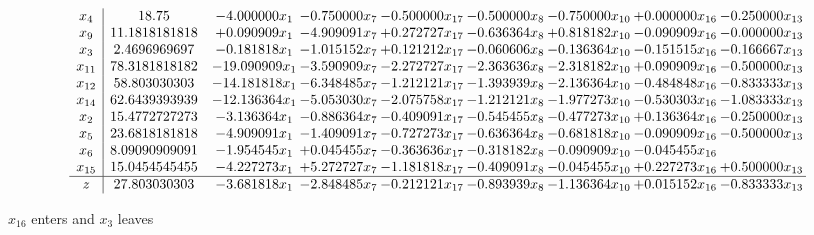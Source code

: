 \documentclass[10pt]{article}
\begin{document}
 \[\begin{array}{c| c c@{\hskip 2pt} c@{\hskip 2pt} c@{\hskip 2pt} c@{\hskip 2pt} c@{\hskip 2pt} c@{\hskip 2pt} c@{\hskip 2pt} }
 x_{4}   &  18.75 & -4.000000 x_{1} & -0.750000 x_{7} & -0.500000 x_{17} & -0.500000 x_{8} & -0.750000 x_{10} & + 0.000000 x_{16} & -0.250000 x_{13}\\
 x_{9}   &  11.1818181818 & + 0.090909 x_{1} & -4.909091 x_{7} & + 0.272727 x_{17} & -0.636364 x_{8} & + 0.818182 x_{10} & -0.090909 x_{16} & -0.000000 x_{13}\\
 x_{3}   &  2.4696969697 & -0.181818 x_{1} & -1.015152 x_{7} & + 0.121212 x_{17} & -0.060606 x_{8} & -0.136364 x_{10} & -0.151515 x_{16} & -0.166667 x_{13}\\
 x_{11}   &  78.3181818182 & -19.090909 x_{1} & -3.590909 x_{7} & -2.272727 x_{17} & -2.363636 x_{8} & -2.318182 x_{10} & + 0.090909 x_{16} & -0.500000 x_{13}\\
 x_{12}   &  58.803030303 & -14.181818 x_{1} & -6.348485 x_{7} & -1.212121 x_{17} & -1.393939 x_{8} & -2.136364 x_{10} & -0.484848 x_{16} & -0.833333 x_{13}\\
 x_{14}   &  62.6439393939 & -12.136364 x_{1} & -5.053030 x_{7} & -2.075758 x_{17} & -1.212121 x_{8} & -1.977273 x_{10} & -0.530303 x_{16} & -1.083333 x_{13}\\
 x_{2}   &  15.4772727273 & -3.136364 x_{1} & -0.886364 x_{7} & -0.409091 x_{17} & -0.545455 x_{8} & -0.477273 x_{10} & + 0.136364 x_{16} & -0.250000 x_{13}\\
 x_{5}   &  23.6818181818 & -4.909091 x_{1} & -1.409091 x_{7} & -0.727273 x_{17} & -0.636364 x_{8} & -0.681818 x_{10} & -0.090909 x_{16} & -0.500000 x_{13}\\
 x_{6}   &  8.09090909091 & -1.954545 x_{1} & + 0.045455 x_{7} & -0.363636 x_{17} & -0.318182 x_{8} & -0.090909 x_{10} & -0.045455 x_{16} &   \\
 x_{15}   &  15.0454545455 & -4.227273 x_{1} & + 5.272727 x_{7} & -1.181818 x_{17} & -0.409091 x_{8} & -0.045455 x_{10} & + 0.227273 x_{16} & + 0.500000 x_{13}\\
\hline
z    &  27.803030303 & -3.681818 x_{1} & -2.848485 x_{7} & -0.212121 x_{17} & -0.893939 x_{8} & -1.136364 x_{10} & + 0.015152 x_{16} & -0.833333 x_{13}\\
\end{array}\]


 $ x_{16} $ enters and $ x_{3} $ leaves 
\end{document}
